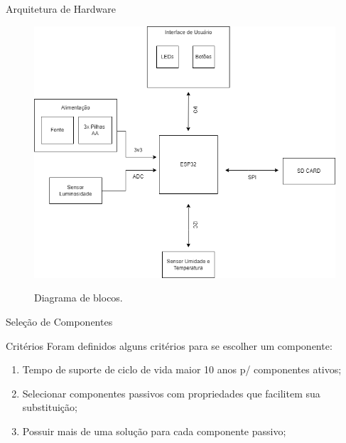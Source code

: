     
      
\begin{frame}{Arquitetura de Hardware}

    \begin{figure}
        \centering
        \caption{Diagrama de blocos.}
        \includegraphics[scale=0.3]{figuras/cap3/datalogger_tcc.png}
        \label{fig:block_diagram}
    \end{figure}
    
\end{frame}


\begin{frame}{Seleção de Componentes}

    \begin{block}{Critérios}
        Foram definidos alguns critérios para se escolher um componente:
        
        \begin{enumerate}
            
            \item Tempo de suporte de ciclo de vida maior 10 anos p/ componentes ativos;
            \item Selecionar componentes passivos com propriedades que facilitem sua substituição;
            \item Possuir mais de uma solução para cada componente passivo;
            
        \end{enumerate}
    
        
    \end{block}

\end{frame}

